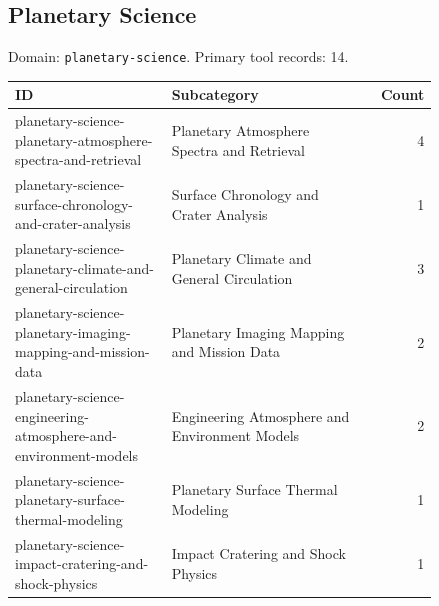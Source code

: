 \subsection{Planetary Science}
\noindent Domain: \texttt{planetary-science}. Primary tool records: 14.
\begin{longtable}{p{0.37\linewidth}p{0.47\linewidth}r}
ID & Subcategory & Count\\\hline\endhead
planetary-science-planetary-atmosphere-spectra-and-retrieval & Planetary Atmosphere Spectra and Retrieval & 4\\
planetary-science-surface-chronology-and-crater-analysis & Surface Chronology and Crater Analysis & 1\\
planetary-science-planetary-climate-and-general-circulation & Planetary Climate and General Circulation & 3\\
planetary-science-planetary-imaging-mapping-and-mission-data & Planetary Imaging Mapping and Mission Data & 2\\
planetary-science-engineering-atmosphere-and-environment-models & Engineering Atmosphere and Environment Models & 2\\
planetary-science-planetary-surface-thermal-modeling & Planetary Surface Thermal Modeling & 1\\
planetary-science-impact-cratering-and-shock-physics & Impact Cratering and Shock Physics & 1\\
\end{longtable}
